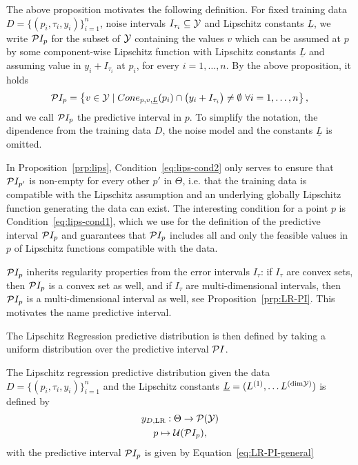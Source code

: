 The above proposition motivates the following definition.
For fixed training data $D =\{(p_i, \tau_i, y_i)\}_{i=1}^n $, noise intervals $I_{\tau_i} \subseteq \mathcal Y$ and Lipschitz constants $\underline L$, we write $\mathcal P I_p$ for the subset of $\mathcal Y$ containing the values $v$ which can be assumed at $p$ by some component-wise Lipschitz function with Lipschitz constants $\underline L$ and assuming value in $y_i + I_{\tau_i}$ at $p_i$, for every $i=1, \dots, n$.  \newline
By the above proposition, it holds
\begin{equation}\label{eq:LR-PI-general}
    \mathcal PI_p = \left \{ v \in \mathcal Y \mid Cone_{p,v,\underline L}(p_i) \cap  \big ( y_i + I_{\tau_i} \big ) \neq \emptyset \ \forall i = 1, \dots, n \right \},
\end{equation}
and we call $\mathcal P I_p$ the predictive interval in $p$.
To simplify the notation, the dipendence from the training data $D$, the noise model and the constants $\underline L$ is omitted.
\begin{rmk}
    In Proposition~\ref{prp:lips}, Condition~\eqref{eq:lips-cond2} only serves to ensure that $\mathcal PI_{p'}$ is non-empty for every other $p'$ in $\Theta$, i.e. that the training data is compatible with the Lipschitz assumption and an underlying globally Lipschitz function generating the data can exist. \newline
    The interesting condition for a point $p$ is Condition~\eqref{eq:lips-cond1}, which we use for the definition of the predictive interval $\mathcal PI_p$ and guarantees that $\mathcal PI_p$ includes all and only the feasible values in $p$ of Lipschitz functions compatible with the data.
\end{rmk}
\begin{rmk}
    $\mathcal PI_p$ inherits regularity properties from the error intervals $I_\tau$: if $I_\tau$ are convex sets, then $\mathcal PI_p$ is a convex set as well, and if $I_\tau$ are multi-dimensional intervals, then $\mathcal PI_p$ is a multi-dimensional interval as well, see Proposition~\ref{prp:LR-PI}. 
    This motivates the name predictive interval. 
\end{rmk}

The Lipschitz Regression predictive distribution is then defined by taking a uniform distribution over the predictive interval $\mathcal P I$.
\begin{dfn}  \label{dfn:LR}
    The Lipschitz regression predictive distribution given the data $D=\{ (p_i, \tau_i, y_i) \}_{i=1}^n$ and the Lipschitz constants $\underline{L} = (L^{(1)},\dots L^{(\text{dim}\mathcal Y)})$ is defined by
    \begin{gather*}
        y_{D, \text{LR}} : \Theta \rightarrow \mathcal P( \mathcal Y) \\
        p \mapsto \mathcal U( \mathcal PI_p ),
    \end{gather*}
    with the predictive interval $\mathcal PI_p$ is given by Equation~\eqref{eq:LR-PI-general}
\end{dfn}

